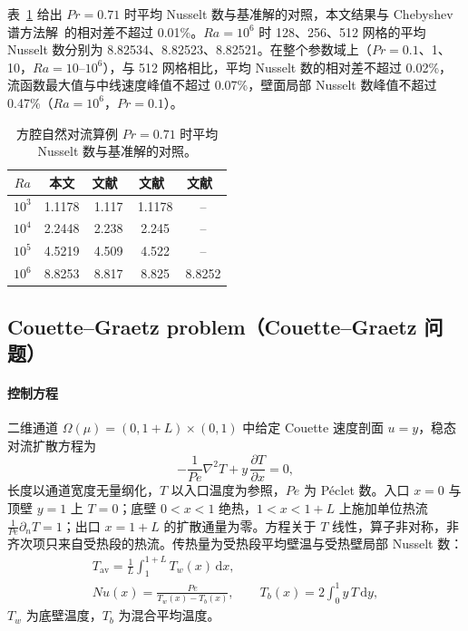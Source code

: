 表~\ref{tab:benchmark} 给出 $Pr=0.71$ 时平均 Nusselt 数与基准解的对照，本文结果与 Chebyshev 谱方法解~\cite{lequere1985computation,lequere1991accurate}的相对差不超过 0.01\%。$Ra=10^6$ 时 128、256、512 网格的平均 Nusselt 数分别为 8.82534、8.82523、8.82521。在整个参数域上（$Pr=0.1$、1、10，$Ra=10$--$10^6$），与 512 网格相比，平均 Nusselt 数的相对差不超过 0.02\%，流函数最大值与中线速度峰值不超过 0.07\%，壁面局部 Nusselt 数峰值不超过 0.47\%（$Ra=10^6$，$Pr=0.1$）。

\begin{table}[H]
\centering
\caption{方腔自然对流算例 $Pr=0.71$ 时平均 Nusselt 数与基准解的对照。}
\label{tab:benchmark}
\begin{tabular}{ccccc}
\toprule
$Ra$ & 本文 & 文献~\cite{devahldavis1983natural} & 文献~\cite{lequere1985computation} & 文献~\cite{lequere1991accurate} \\
\midrule
$10^3$ & 1.1178 & 1.117 & 1.1178 & -- \\
$10^4$ & 2.2448 & 2.238 & 2.245  & -- \\
$10^5$ & 4.5219 & 4.509 & 4.522  & -- \\
$10^6$ & 8.8253 & 8.817 & 8.825  & 8.8252 \\
\bottomrule
\end{tabular}
\end{table}

\subsection{Couette--Graetz problem（Couette--Graetz 问题）}
\label{app:graetz}

\paragraph{控制方程}
二维通道 $\Omega(\mu)=(0,1+L)\times(0,1)$ 中给定 Couette 速度剖面 $u=y$，稳态对流扩散方程为~\cite{quarteroni2011certified}
\begin{equation}
-\frac{1}{Pe}\nabla^2T+y\,\frac{\partial T}{\partial x}=0 ,
\label{eq:graetz}
\end{equation}
长度以通道宽度无量纲化，$T$ 以入口温度为参照，$Pe$ 为 P\'eclet 数。入口 $x=0$ 与顶壁 $y=1$ 上 $T=0$；底壁 $0<x<1$ 绝热，$1<x<1+L$ 上施加单位热流 $\frac1{Pe}\partial_nT=1$；出口 $x=1+L$ 的扩散通量为零。方程关于 $T$ 线性，算子非对称，非齐次项只来自受热段的热流。传热量为受热段平均壁温与受热壁局部 Nusselt 数：
\begin{equation}
\begin{gathered}
T_{\mathrm{av}}=\frac1L\int_1^{1+L}T_w(x)\,\mathrm dx,\\
Nu(x)=\frac{Pe}{T_w(x)-T_b(x)},\qquad
T_b(x)=2\int_0^1 y\,T\,\mathrm dy ,
\end{gathered}
\label{eq:graetz_out}
\end{equation}
$T_w$ 为底壁温度，$T_b$ 为混合平均温度。

